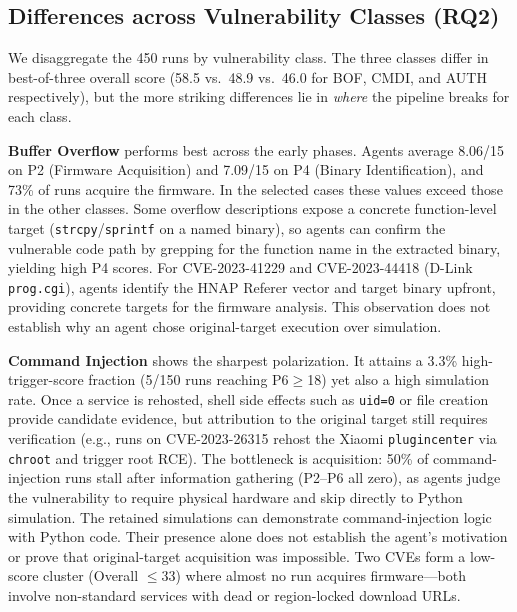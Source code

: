 \subsection{Differences across Vulnerability Classes (RQ2)}



We disaggregate the 450 runs by vulnerability class. The three classes differ in best-of-three overall score (58.5 vs.\ 48.9 vs.\ 46.0 for BOF, CMDI, and AUTH respectively), but the more striking differences lie in \emph{where} the pipeline breaks for each class.


\noindent\textbf{Buffer Overflow} performs best across the early phases. Agents average 8.06/15 on P2 (Firmware Acquisition) and 7.09/15 on P4 (Binary Identification), and 73\% of runs acquire the firmware. In the selected cases these values exceed those in the other classes. Some overflow descriptions expose a concrete function-level target (\texttt{strcpy}/\texttt{sprintf} on a named binary), so agents can confirm the vulnerable code path by grepping for the function name in the extracted binary, yielding high P4 scores. For CVE-2023-41229 and CVE-2023-44418 (D-Link \texttt{prog.cgi}), agents identify the HNAP Referer vector and target binary upfront, providing concrete targets for the firmware analysis. This observation does not establish why an agent chose original-target execution over simulation.


\noindent\textbf{Command Injection} shows the sharpest polarization. It attains a 3.3\% high-trigger-score fraction (5/150 runs reaching P6$\geq$18) yet also a high simulation rate. Once a service is rehosted, shell side effects such as \texttt{uid=0} or file creation provide candidate evidence, but attribution to the original target still requires verification (e.g., runs on CVE-2023-26315 rehost the Xiaomi \texttt{plugincenter} via \texttt{chroot} and trigger root RCE). The bottleneck is acquisition: 50\% of command-injection runs stall after information gathering (P2--P6 all zero), as agents judge the vulnerability to require physical hardware and skip directly to Python simulation. The retained simulations can demonstrate command-injection logic with Python code. Their presence alone does not establish the agent's motivation or prove that original-target acquisition was impossible. Two CVEs form a low-score cluster (Overall $\leq$33) where almost no run acquires firmware---both involve non-standard services with dead or region-locked download URLs.


